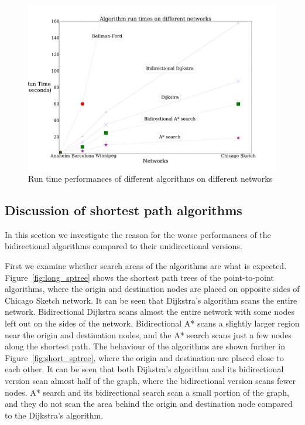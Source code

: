 \begin{figure}[!ht]
    \centering
    \includegraphics[width=\textwidth]{img/runtime}
    \caption{Run time performances of different algorithms on different networks}
    \label{fig:allresults}
\end{figure}

\subsection{Discussion of shortest path algorithms}
In this section we investigate the reason for the worse performances of the bidirectional algorithms compared to their unidirectional versions. 

First we examine whether search areas of the algorithms are what is expected.
Figure~\ref{fig:long_sptree} shows the shortest path trees of the point-to-point algorithms, 
where the origin and destination nodes are placed on opposite sides of Chicago Sketch network.
It can be seen that Dijkstra's algorithm scans the entire network.
Bidirectional Dijkstra scans almost the entire network with some nodes left out on the sides of the network.
Bidirectional A* scans a slightly larger region near the origin and destination nodes,
and the A* search scans just a few nodes along the shortest path.
The behaviour of the algorithms are shown further in Figure~\ref{fig:short_sptree},
where the origin and destination are placed close to each other.
It can be seen that both Dijkstra's algorithm and its bidirectional version scan almost half of the graph,
where the bidirectional version scans fewer nodes.
A* search and its bidirectional search scan a small portion of the graph,
and they do not scan the area behind the origin and destination node compared to the Dijkstra's algorithm.

